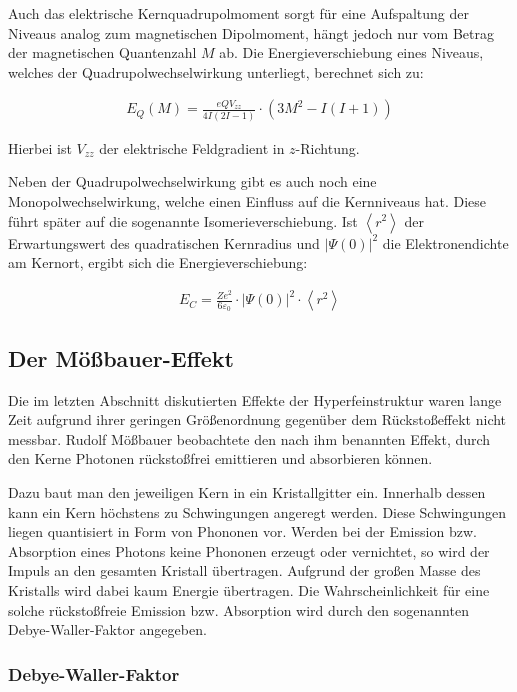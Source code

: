 \documentclass[
a4paper,                %
titlepage=firstiscover, %
captions=tableheading,  %
toc=bibliography,       %
toc=listof,             %
oneside,                %
automark,               %
12pt,                   %
english, ngerman,       %
parskip = half,         %
]{scrartcl}
\begin{document}
Auch das elektrische Kernquadrupolmoment sorgt für eine Aufspaltung der Niveaus analog zum magnetischen Dipolmoment, hängt jedoch nur vom Betrag der magnetischen Quantenzahl $M$ ab.
Die Energieverschiebung eines Niveaus, welches der Quadrupolwechselwirkung unterliegt, berechnet sich zu:

\begin{align}
E_Q(M)=\frac{eQV_{zz}}{4I(2I-1)}\cdot\left( 3M^2 - I(I+1)\right) 
\end{align}

\noindent Hierbei ist $V_{zz}$ der elektrische Feldgradient in $z$-Richtung.

Neben der Quadrupolwechselwirkung gibt es auch noch eine Monopolwechselwirkung, welche einen Einfluss auf die Kernniveaus hat.
Diese führt später auf die sogenannte Isomerieverschiebung.
Ist $\left\langle r^2\right\rangle $ der Erwartungswert des quadratischen Kernradius und $\left| \Psi(0)\right|^2$ die Elektronendichte am Kernort, ergibt sich die Energieverschiebung:

\begin{align} \label{eq:monopol}
E_C = \frac{Ze^2}{6\varepsilon_0}\cdot\left| \Psi(0)\right|^2\cdot\left\langle r^2\right\rangle
\end{align}


\subsection{Der Mößbauer-Effekt}

Die im letzten Abschnitt diskutierten Effekte der Hyperfeinstruktur waren lange Zeit aufgrund ihrer geringen Größenordnung gegenüber dem Rückstoßeffekt nicht messbar.
Rudolf Mößbauer beobachtete den nach ihm benannten Effekt, durch den Kerne Photonen rückstoßfrei emittieren und absorbieren können. 

Dazu baut man den jeweiligen Kern in ein Kristallgitter ein.
Innerhalb dessen kann ein Kern höchstens zu Schwingungen angeregt werden.
Diese Schwingungen liegen quantisiert in Form von Phononen vor.
Werden bei der Emission bzw. Absorption eines Photons keine Phononen erzeugt oder vernichtet, so wird der Impuls an den gesamten Kristall übertragen.
Aufgrund der großen Masse des Kristalls wird dabei kaum Energie übertragen.
Die Wahrscheinlichkeit für eine solche rückstoßfreie Emission bzw. Absorption wird durch den sogenannten Debye-Waller-Faktor angegeben. 


\subsubsection{Debye-Waller-Faktor} \label{DebyeWaller}
\end{document}
